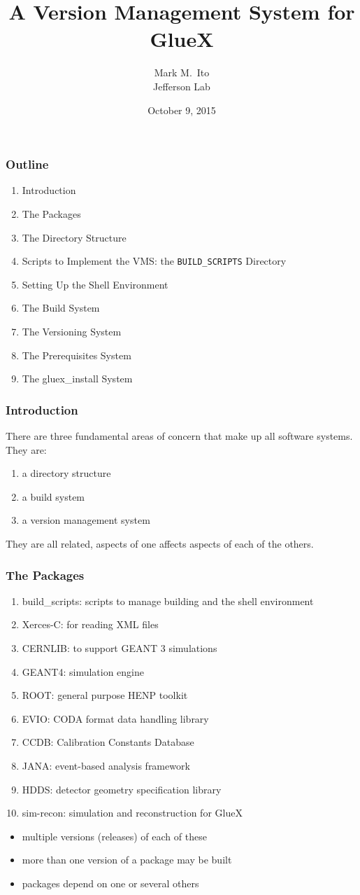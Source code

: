 \documentclass{beamer}
\title{A Version Management System for GlueX}
\author{Mark M.\ Ito \\ \medskip Jefferson Lab}
\date{October 9, 2015}
\newcommand{\be}{\begin{enumerate}}
\newcommand{\ee}{\end{enumerate}}
\newcommand{\I}{\item}
\newcommand{\ft}{\frametitle}
\begin{document}
\maketitle

\begin{frame}
\ft{Outline}
  \be
\I {Introduction}
\I {The Packages}
\I {The Directory Structure}\label{section:directory}
\I {Scripts to Implement the VMS: the {\tt BUILD\_SCRIPTS} Directory}
\I {Setting Up the Shell Environment}
\I {The Build System}
\I {The Versioning System}\label{section:versioning}
\I {The Prerequisites System}\label{section:prerequisites-system}
\I {The gluex\_install System}
\ee
\end{frame}

\begin{frame}\frametitle{Introduction}
There are three fundamental areas of concern that make up all software
systems. They are:

\begin{enumerate}
\item a directory structure
\item a build system
\item a version management system
\end{enumerate}

They are all related, aspects of one affects aspects of each of the others.

\end{frame}\begin{frame}\frametitle{The Packages}

\begin{enumerate}
\item build\_scripts: scripts to manage building and the shell environment
\item Xerces-C: for reading XML files
\item CERNLIB: to support GEANT 3 simulations
\item GEANT4: simulation engine
\item ROOT: general purpose HENP toolkit
\item EVIO: CODA format data handling library
\item CCDB: Calibration Constants Database
\item JANA: event-based analysis framework
\item HDDS: detector geometry specification library 
\item sim-recon: simulation and reconstruction for GlueX
\end{enumerate}

\begin{itemize}
\item multiple versions (releases) of each of these
\item more than one version of a package may be built
\item packages depend on one or several others
\end{itemize}

\end{frame}
\end{document}
